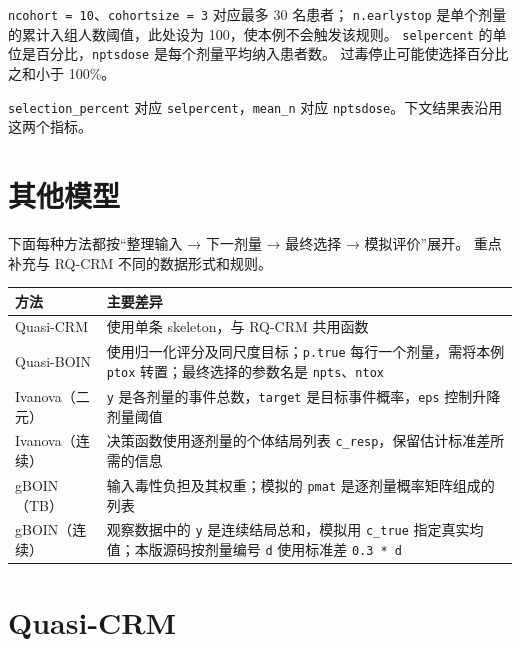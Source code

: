 \documentclass[
  chinese,
]{article}
\newcounter{none} %
\begin{document}
\texttt{ncohort\ =\ 10}、\texttt{cohortsize\ =\ 3} 对应最多 30 名患者；
\texttt{n.earlystop} 是单个剂量的累计入组人数阈值，此处设为
100，使本例不会触发该规则。 \texttt{selpercent}
的单位是百分比，\texttt{nptsdose} 是每个剂量平均纳入患者数。
过毒停止可能使选择百分比之和小于 100\%。

\texttt{selection\_percent} 对应 \texttt{selpercent}，\texttt{mean\_n}
对应 \texttt{nptsdose}。下文结果表沿用这两个指标。

\section{其他模型}\label{ux5176ux4ed6ux6a21ux578b}

下面每种方法都按``整理输入 → 下一剂量 → 最终选择 → 模拟评价''展开。
重点补充与 RQ-CRM 不同的数据形式和规则。

{\def\LTcaptype{none} %
\begin{longtable}[]{@{}
  >{\raggedright\arraybackslash}p{}
  >{\raggedright\arraybackslash}p{}@{}}
\toprule\noalign{}
\begin{minipage}[b]{\linewidth}\raggedright
方法
\end{minipage} & \begin{minipage}[b]{\linewidth}\raggedright
主要差异
\end{minipage} \\
\midrule\noalign{}
\endhead
\bottomrule\noalign{}
\endlastfoot
Quasi-CRM & 使用单条 skeleton，与 RQ-CRM 共用函数 \\
Quasi-BOIN & 使用归一化评分及同尺度目标；\texttt{p.true}
每行一个剂量，需将本例 \texttt{ptox} 转置；最终选择的参数名是
\texttt{npts}、\texttt{ntox} \\
Ivanova（二元） & \texttt{y} 是各剂量的事件总数，\texttt{target}
是目标事件概率，\texttt{eps} 控制升降剂量阈值 \\
Ivanova（连续） & 决策函数使用逐剂量的个体结局列表
\texttt{c\_resp}，保留估计标准差所需的信息 \\
gBOIN（TB） & 输入毒性负担及其权重；模拟的 \texttt{pmat}
是逐剂量概率矩阵组成的列表 \\
gBOIN（连续） & 观察数据中的 \texttt{y} 是连续结局总和，模拟用
\texttt{c\_true} 指定真实均值；本版源码按剂量编号 \texttt{d} 使用标准差
\texttt{0.3\ *\ d} \\
\end{longtable}
}

\section{Quasi-CRM}\label{quasi-crm}
\end{document}
